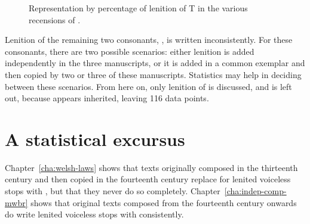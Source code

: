\begin{figure}[h]
    \centering
  \caption{Representation by percentage of lenition of \gls{T} in the various recensions of .}
  \label{fig:barchartdewi}
  \end{figure}

Lenition of the remaining two consonants, , is written inconsistently. For these consonants, there are two possible scenarios: either lenition is added independently in the three manuscripts, or it is added in a common exemplar and then copied by two or three of these manuscripts. Statistics may help in deciding between these scenarios.
From here on, only lenition of  is discussed, and  is left out, because  appears inherited, leaving 116 data points.

\section{A statistical excursus}
\label{sec:statistical-excursus}

Chapter~\ref{cha:welsh-laws}  shows that texts originally composed in the thirteenth century and then copied in the fourteenth century replace  for lenited voiceless stops with , but that they never do so completely. Chapter~\ref{cha:indep-comp-mwbr}  shows that original texts composed from the fourteenth century onwards do write lenited voiceless stops with  consistently.

